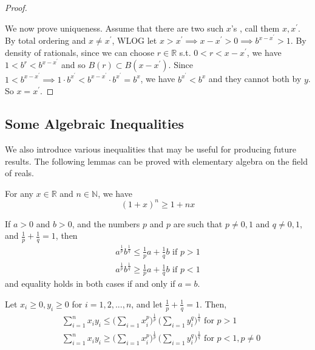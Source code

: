 \begin{proof}
\begin{enumerate}
    \end{enumerate}
    We now prove uniqueness. Assume that there are two such $x$'s , call them $x, x^\prime$. By total ordering and $x \neq x^\prime$, WLOG let $x > x^\prime \implies x - x^\prime > 0 \implies b^{x - x^\prime} > 1$. By density of rationals, since we can choose $r \in \mathbb{R}$ s.t. $0 < r < x - x^\prime$, we have $1 < b^r < b^{x - x^\prime}$ and so $B(r) \subset B(x - x^\prime)$. Since $1 < b^{x - x^\prime} \implies 1 \cdot b^{x^\prime} < b^{x - x^\prime} \cdot b^{x^\prime} = b^x$, we have $b^{x^\prime} < b^x$ and they cannot both by $y$. So $x = x^\prime$. 
  \end{proof}

\subsection{Some Algebraic Inequalities}

  We also introduce various inequalities that may be useful for producing future results. The following lemmas can be proved with elementary algebra on the field of reals. 

  \begin{lemma}
    For any $x \in \mathbb{R}$ and $n \in \mathbb{N}$, we have 
    \begin{equation}
      (1 + x)^n \geq 1 + nx
    \end{equation}
  \end{lemma}

  \begin{lemma}
    If $a>0$ and $b>0$, and the numbers $p$ and $p$ are such that $p \neq 0, 1$ and $q \neq 0, 1$, and $\frac{1}{p} + \frac{1}{q} = 1$, then 
    \begin{align*}
        a^{\frac{1}{p}} b^{\frac{1}{q}} \leq \frac{1}{p} a + \frac{1}{q} b \text{  if } p > 1 \\
        a^{\frac{1}{p}} b^{\frac{1}{q}} \geq \frac{1}{p} a + \frac{1}{q} b \text{  if } p < 1
    \end{align*}
    and equality holds in both cases if and only if $a = b$. 
  \end{lemma}

  \begin{lemma}
    Let $x_i \geq 0, y_i \geq 0$ for $i = 1, 2, ..., n$, and let $\frac{1}{p} + \frac{1}{q} = 1$. Then, 
    \begin{align*}
        &\sum_{i=1}^n x_i y_i \leq \bigg( \sum_{i=1} x_i^p \bigg)^{\frac{1}{p}} \, \bigg( \sum_{i=1} y_i^q \bigg)^{\frac{1}{q}} \text{  for } p > 1 \\
        &\sum_{i=1}^n x_i y_i \geq \bigg( \sum_{i=1} x_i^p \bigg)^{\frac{1}{p}} \, \bigg( \sum_{i=1} y_i^q \bigg)^{\frac{1}{q}} \text{  for } p < 1, p \neq 0
    \end{align*}
  \end{lemma}

